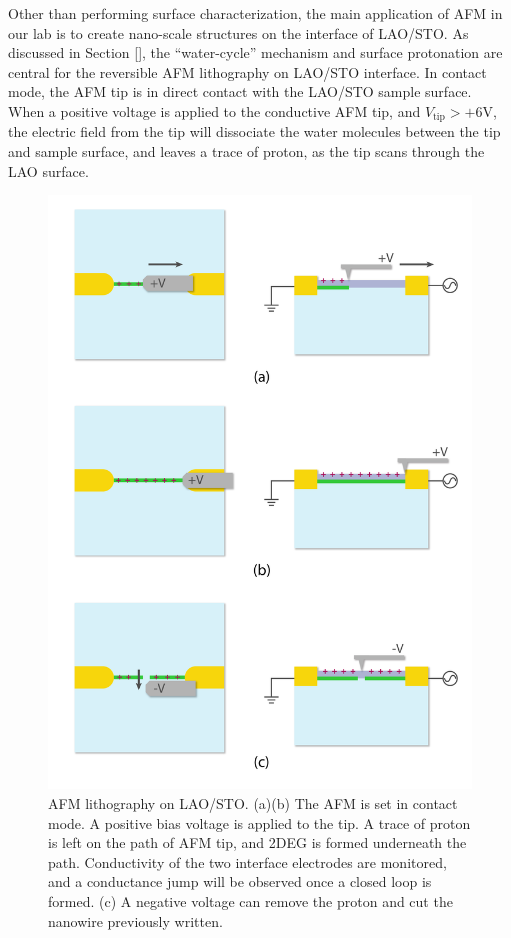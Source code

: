 \documentclass[pdflatex, sectionletters, 12pt]{pittetd}    %
\begin{document}
Other than performing surface characterization, the main application of AFM in our lab is to create nano-scale structures on the interface of LAO/STO. As discussed in Section \ref{}, the ``water-cycle'' mechanism\cite{bi2010water} and surface protonation\cite{} are central for the reversible AFM lithography on LAO/STO interface. In contact mode, the AFM tip is in direct contact with the LAO/STO sample surface. When a positive voltage is applied to the conductive AFM tip, and $V_\mathrm{tip} > +6$V\cite{cen2008nanoscale}, the electric field from the tip will dissociate the water molecules between the tip and sample surface, and leaves a trace of proton, as the tip scans through the LAO surface. 

\begin{figure}[p]
	\centering
	\includegraphics[width=.80\textwidth]{Drawing/Lithography.pdf}
	\caption{AFM lithography on LAO/STO. (a)(b) The AFM is set in contact mode. A positive bias voltage is applied to the tip. A trace of proton is left on the path of AFM tip, and 2DEG is formed underneath the path. Conductivity of the two interface electrodes are monitored, and a conductance jump will be observed once a closed loop is formed. (c) A negative voltage can remove the proton and cut the nanowire previously written.}
	\label{FIG:Lithography}
\end{figure}
\end{document}
